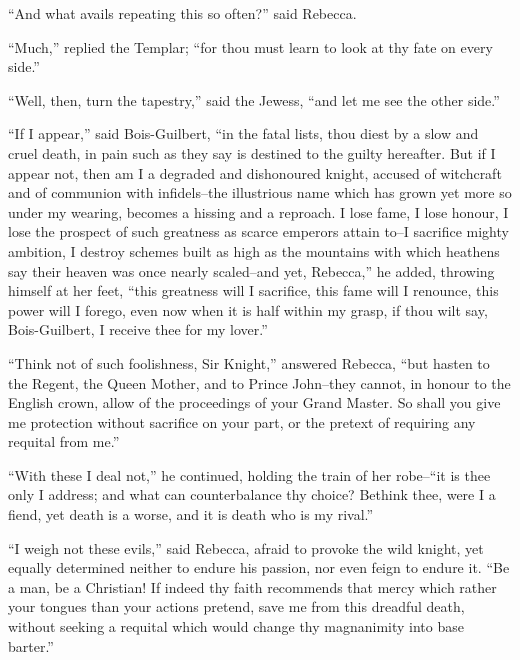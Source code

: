 ``And what avails repeating this so often?'' said Rebecca.

``Much,'' replied the Templar; ``for thou must learn to look at thy fate
on every side.''

``Well, then, turn the tapestry,'' said the Jewess, ``and let me see the
other side.''

``If I appear,'' said Bois-Guilbert, ``in the fatal lists, thou diest by
a slow and cruel death, in pain such as they say is destined to the
guilty hereafter. But if I appear not, then am I a degraded and
dishonoured knight, accused of witchcraft and of communion with
infidels--the illustrious name which has grown yet more so under my
wearing, becomes a hissing and a reproach. I lose fame, I lose honour, I
lose the prospect of such greatness as scarce emperors attain to--I
sacrifice mighty ambition, I destroy schemes built as high as the
mountains with which heathens say their heaven was once nearly
scaled--and yet, Rebecca,'' he added, throwing himself at her feet,
``this greatness will I sacrifice, this fame will I renounce, this power
will I forego, even now when it is half within my grasp, if thou wilt
say, Bois-Guilbert, I receive thee for my lover.''

``Think not of such foolishness, Sir Knight,'' answered Rebecca, ``but
hasten to the Regent, the Queen Mother, and to Prince John--they cannot,
in honour to the English crown, allow of the proceedings of your Grand
Master. So shall you give me protection without sacrifice on your part,
or the pretext of requiring any requital from me.''

``With these I deal not,'' he continued, holding the train of her
robe--``it is thee only I address; and what can counterbalance thy
choice? Bethink thee, were I a fiend, yet death is a worse, and it is
death who is my rival.''

``I weigh not these evils,'' said Rebecca, afraid to provoke the wild
knight, yet equally determined neither to endure his passion, nor even
feign to endure it. ``Be a man, be a Christian! If indeed thy faith
recommends that mercy which rather your tongues than your actions
pretend, save me from this dreadful death, without seeking a requital
which would change thy magnanimity into base barter.''

